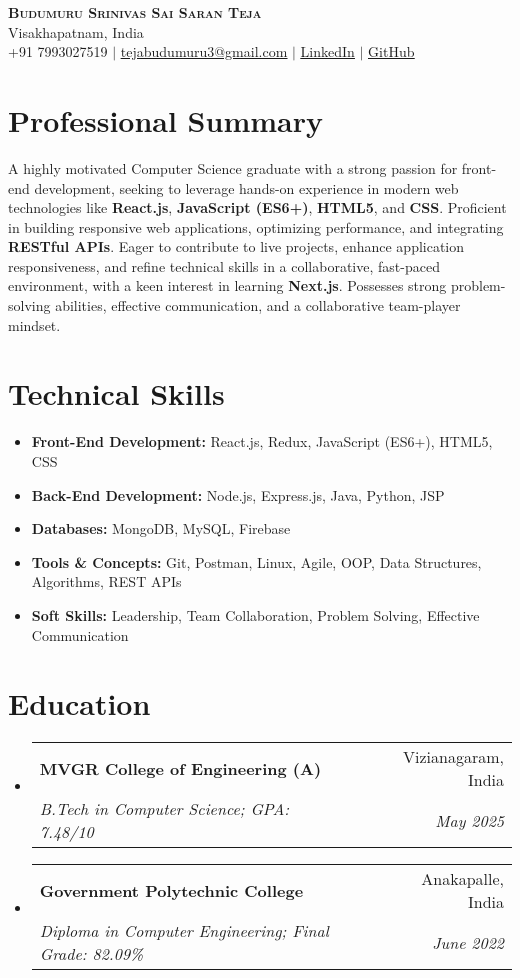 \documentclass[article,11pt]{article}
\makeatletter
\newcommand{\resumeSubheading}[4]{
\item
    \begin{tabular*}{0.97\textwidth}[t]{l@{\extracolsep{\fill}}r}
    \textbf{#1} & #2 \\
    \textit{\small#3} & \textit{\small #4}
    \end{tabular*}
}
\newcommand{\resumeItem}[1]{\item\small{#1}}
\newcommand{\resumeSubHeadingListStart}{\begin{itemize}[leftmargin=0.15in, label={}]}
\newcommand{\resumeSubHeadingListEnd}{\end{itemize}}
\makeatother
\begin{document}
\begin{center}
    \textbf{\Huge \scshape Budumuru Srinivas Sai Saran Teja} \\ \vspace{1pt}
    Visakhapatnam, India \\
    \small +91 7993027519 $|$ \href{mailto:tejabudumuru3@gmail.com}{\underline{tejabudumuru3@gmail.com}} $|$
    \href{https://linkedin.com/in/saran-teja-budumuru}{\underline{LinkedIn}} $|$
    \href{https://github.com/SaranTeja2004}{\underline{GitHub}}
\end{center}

\section*{Professional Summary}
A highly motivated Computer Science graduate with a strong passion for front-end development, seeking to leverage hands-on experience in modern web technologies like \textbf{React.js}, \textbf{JavaScript (ES6+)}, \textbf{HTML5}, and \textbf{CSS}. Proficient in building responsive web applications, optimizing performance, and integrating \textbf{RESTful APIs}. Eager to contribute to live projects, enhance application responsiveness, and refine technical skills in a collaborative, fast-paced environment, with a keen interest in learning \textbf{Next.js}. Possesses strong problem-solving abilities, effective communication, and a collaborative team-player mindset.

\section{Technical Skills}
\resumeSubHeadingListStart
    \resumeItem{\textbf{Front-End Development:} React.js, Redux, JavaScript (ES6+), HTML5, CSS}
    \resumeItem{\textbf{Back-End Development:} Node.js, Express.js, Java, Python, JSP}
    \resumeItem{\textbf{Databases:} MongoDB, MySQL, Firebase}
    \resumeItem{\textbf{Tools \& Concepts:} Git, Postman, Linux, Agile, OOP, Data Structures, Algorithms, REST APIs}
    \resumeItem{\textbf{Soft Skills:} Leadership, Team Collaboration, Problem Solving, Effective Communication}
\resumeSubHeadingListEnd

\section{Education}
\resumeSubHeadingListStart
    \resumeSubheading
    {MVGR College of Engineering (A)}{Vizianagaram, India}
    {B.Tech in Computer Science; GPA: 7.48/10}{May 2025}
    \resumeSubheading
    {Government Polytechnic College}{Anakapalle, India}
    {Diploma in Computer Engineering; Final Grade: 82.09\%}{June 2022}
\resumeSubHeadingListEnd
\end{document}
